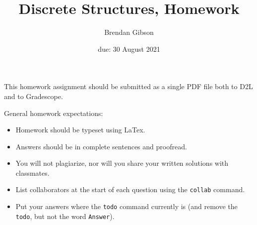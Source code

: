 \documentclass{article}
\title{Discrete Structures, Homework \hwnum}
\author{Brendan Gibson}
\date{due: 30 August 2021}
\begin{document}
\maketitle

This homework assignment should be
submitted as a single PDF file both to D2L and to Gradescope.

General homework expectations:
\begin{itemize}
    \item Homework should be typeset using LaTex.
    \item Answers should be in complete sentences and proofread.
    \item You will not plagiarize, nor will you share your written solutions
        with classmates.
    \item List collaborators at the start of each question using the
        \texttt{collab} command.
    \item Put your answers where the \texttt{todo} command currently is (and
        remove the \texttt{todo}, but not the word \texttt{Answer}).
\end{itemize}

\end{document}
